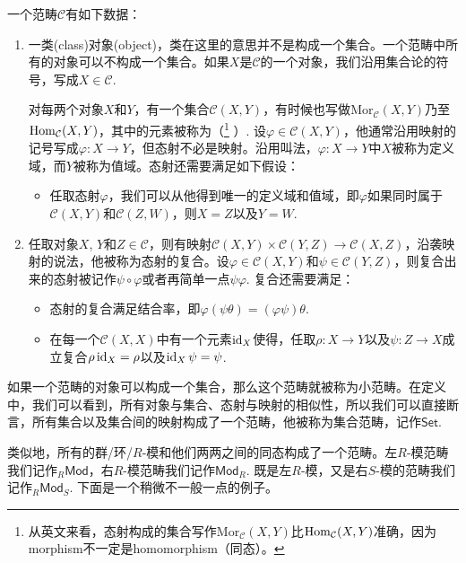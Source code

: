 \para 一个范畴$\mathcal{C}$有如下数据：
\begin{enumerate}
\item 一类(class)对象(object)，类在这里的意思并不是构成一个集合。一个范畴中所有的对象可以不构成一个集合。如果$X$是$\mathcal{C}$的一个对象，我们沿用集合论的符号，写成$X\in \mathcal{C}$.

对每两个对象$X$和$Y$，有一个集合$\mathcal{C}(X,Y)$，有时候也写做$\mathrm{Mor}_{\mathcal{C}}(X,Y)$乃至$\operatorname{Hom}_{\mathcal{C}}(X,Y)$，其中的元素被称为（\footnote{从英文来看，态射构成的集合写作$\mathrm{Mor}_{\mathcal{C}}(X,Y)$比$\operatorname{Hom}_{\mathcal{C}}(X,Y)$准确，因为morphism不一定是homomorphism（同态）。}
）. 设$\varphi\in \mathcal{C}(X,Y)$，他通常沿用映射的记号写成$\varphi:X\to Y$，但态射不必是映射。沿用叫法，$\varphi:X\to Y$中$X$被称为定义域，而$Y$被称为值域。态射还需要满足如下假设：

\begin{itemize}

\item 任取态射$\varphi$，我们可以从他得到唯一的定义域和值域，即$\varphi$如果同时属于$\mathcal{C}(X,Y)$和$\mathcal{C}(Z,W)$，则$X=Z$以及$Y=W$.

\end{itemize}

\item 任取对象$X$, $Y$和$Z\in \mathcal{C}$，则有映射$\mathcal{C}(X,Y)\times \mathcal{C}(Y,Z)\to \mathcal{C}(X,Z)$，沿袭映射的说法，他被称为态射的复合。设$\varphi\in \mathcal{C}(X,Y)$和$\psi \in \mathcal{C}(Y,Z)$，则复合出来的态射被记作$\psi\circ \varphi$或者再简单一点$\psi\varphi$. 复合还需要满足：
\begin{itemize}

\item 态射的复合满足结合率，即$\varphi(\psi\theta)=(\varphi\psi)\theta$.

\item 在每一个$\mathcal{C}(X,X)$中有一个元素$\operatorname{id}_X$使得，任取$\rho:X\to Y$以及$\psi:Z\to X$成立复合$\rho\operatorname{id}_X=\rho$以及$\operatorname{id}_X\psi=\psi$.
\end{itemize}
\end{enumerate}

如果一个范畴的对象可以构成一个集合，那么这个范畴就被称为小范畴。在定义中，我们可以看到，所有对象与集合、态射与映射的相似性，所以我们可以直接断言，所有集合以及集合间的映射构成了一个范畴，他被称为集合范畴，记作$\mathsf{Set}$.

类似地，所有的群/环/$R$-模和他们两两之间的同态构成了一个范畴。左$R$-模范畴我们记作${}_R\mathsf{Mod}$，右$R$-模范畴我们记作$\mathsf{Mod}_R$. 既是左$R$-模，又是右$S$-模的范畴我们记作${}_R\mathsf{Mod}_S$. 下面是一个稍微不一般一点的例子。

